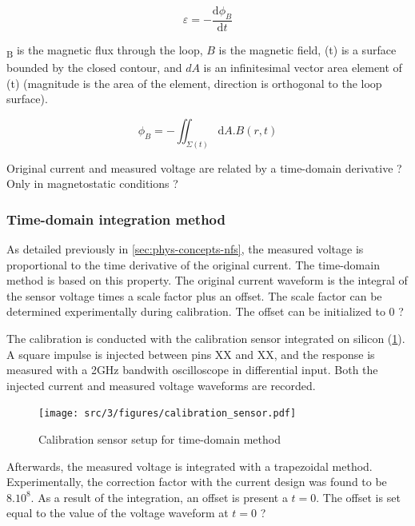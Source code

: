 \begin{equation} \label{eq:faraday}
  \varepsilon = - \frac{\mathrm{d} \phi _{B}}{\mathrm{d} t}
\end{equation}


\textPhi{}\textsubscript{B} is the magnetic flux through the loop, $B$ is the magnetic field, \textSigma{}(t) is a surface bounded by the closed contour,
and $dA$ is an infinitesimal vector area element of \textSigma{}(t) (magnitude is the area of the element, direction is orthogonal to the loop surface).

\begin{equation} \label{eq:phi}
  \phi _{B} = - \iint_{\Sigma(t)} \mathrm{d}A . B(r,t)
\end{equation}

Original current and measured voltage are related by a time-domain derivative ? Only in magnetostatic conditions ?

\subsubsection{Time-domain integration method}

As detailed previously in \ref{sec:phys-concepts-nfs}, the measured voltage is proportional to the time derivative of the original current.
The time-domain method is based on this property.
The original current waveform is the integral of the sensor voltage times a scale factor plus an offset.
The scale factor can be determined experimentally during calibration.
The offset can be initialized to 0 ?

The calibration is conducted with the calibration sensor integrated on silicon (\ref{fig:calibration-sensor}).
A square impulse is injected between pins XX and XX, and the response is measured with a 2GHz bandwith oscilloscope in differential input.
Both the injected current and measured voltage waveforms are recorded.

\begin{figure}[!htbp]
  \centering
  \texttt{[image: src/3/figures/calibration\_sensor.pdf]}
  \caption{Calibration sensor setup for time-domain method}
  \label{fig:calibration-sensor}
\end{figure}

Afterwards, the measured voltage is integrated with a trapezoidal method.
Experimentally, the correction factor with the current design was found to be $8.10^8$.
As a result of the integration, an offset is present a $t=0$.
The offset is set equal to the value of the voltage waveform at $t=0$ ?


